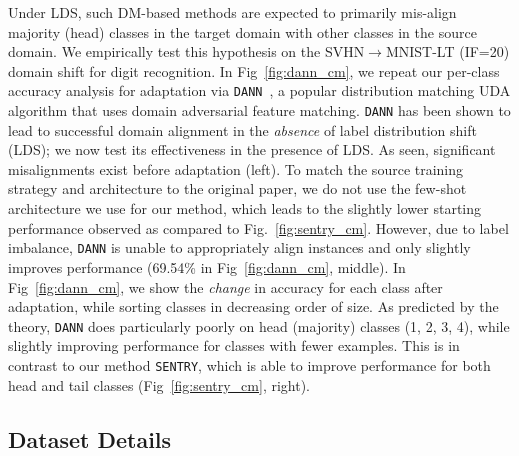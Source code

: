 \documentclass[10pt,twocolumn,letterpaper]{article}
\newcommand{\method}{\texttt{SENTRY}\xspace}
\begin{document}
Under LDS, such DM-based methods are expected to primarily mis-align majority (head) classes in the target domain with other classes in the source domain. We empirically test this hypothesis on the SVHN$\rightarrow$MNIST-LT (IF=20) domain shift for digit recognition. In Fig~\ref{fig:dann_cm}, we repeat our per-class accuracy analysis for adaptation via \texttt{DANN}~\cite{ganin2014unsupervised}, a popular distribution matching UDA algorithm that uses domain adversarial feature matching. \texttt{DANN} has been shown to lead to successful domain alignment in the \emph{absence} of label distribution shift (LDS); we now test its effectiveness in the presence of LDS. As seen, significant misalignments exist before adaptation (left). To match the source training strategy and architecture to the original paper, we do not use the few-shot architecture we use for our method, which leads to the slightly lower starting performance observed as compared to Fig.~\ref{fig:sentry_cm}. However, due to label imbalance, \texttt{DANN} is unable to appropriately align instances and only slightly improves performance (69.54\% in Fig~\ref{fig:dann_cm}, middle). In Fig~\ref{fig:dann_cm}, we show the \emph{change} in accuracy for each class after adaptation, while sorting classes in decreasing order of size. As predicted by the theory, \texttt{DANN} does particularly poorly on head (majority) classes (1, 2, 3, 4), while slightly improving performance for classes with fewer examples. This is in contrast to our method \method, which is able to improve performance for both head and tail classes (Fig~\ref{fig:sentry_cm}, right).


\subsection{Dataset Details} 
\end{document}
